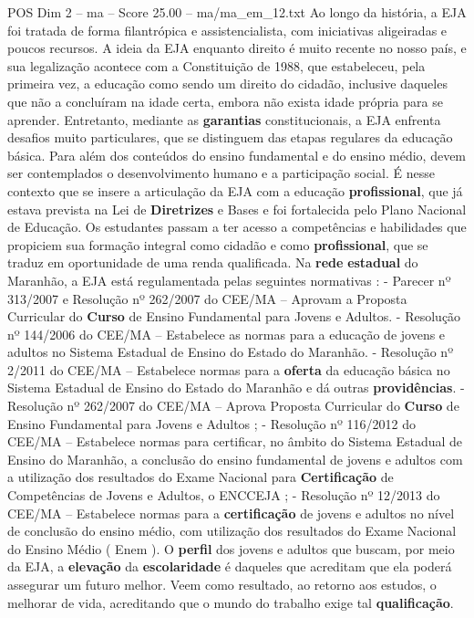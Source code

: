 \begin{textsample}{POS Dim 2 – ma – Score 25.00 – ma/ma\_em\_12.txt}
Ao longo da história, a EJA foi tratada de forma filantrópica e assistencialista, com iniciativas aligeiradas e poucos recursos.
A ideia da EJA enquanto direito é muito recente no nosso país, e sua legalização acontece com a Constituição de 1988, que estabeleceu, pela primeira vez, a educação como sendo um direito do cidadão, inclusive daqueles que não a concluíram na idade certa, embora não exista idade própria para se aprender.
Entretanto, mediante as \textbf{garantias} constitucionais, a EJA enfrenta desafios muito particulares, que se distinguem das etapas regulares da educação básica.
Para além dos conteúdos do ensino fundamental e do ensino médio, devem ser contemplados o desenvolvimento humano e a participação social.
É nesse contexto que se insere a articulação da EJA com a educação \textbf{profissional}, que já estava prevista na Lei de \textbf{Diretrizes} e Bases e foi fortalecida pelo Plano Nacional de Educação.
Os estudantes passam a ter acesso a competências e habilidades que propiciem sua formação integral como cidadão e como \textbf{profissional}, que se traduz em oportunidade de uma renda qualificada.
Na \textbf{rede} \textbf{estadual} do Maranhão, a EJA está regulamentada pelas seguintes normativas : - Parecer nº 313/2007 e Resolução nº 262/2007 do CEE/MA – Aprovam a Proposta Curricular do \textbf{Curso} de Ensino Fundamental para Jovens e Adultos. - Resolução nº 144/2006 do CEE/MA – Estabelece as normas para a educação de jovens e adultos no Sistema Estadual de Ensino do Estado do Maranhão. - Resolução nº 2/2011 do CEE/MA – Estabelece normas para a \textbf{oferta} da educação básica no Sistema Estadual de Ensino do Estado do Maranhão e dá outras \textbf{providências}. - Resolução nº 262/2007 do CEE/MA – Aprova Proposta Curricular do \textbf{Curso} de Ensino Fundamental para Jovens e Adultos ; - Resolução nº 116/2012 do CEE/MA – Estabelece normas para certificar, no âmbito do Sistema Estadual de Ensino do Maranhão, a conclusão do ensino fundamental de jovens e adultos com a utilização dos resultados do Exame Nacional para \textbf{Certificação} de Competências de Jovens e Adultos, o ENCCEJA ; - Resolução nº 12/2013 do CEE/MA – Estabelece normas para a \textbf{certificação} de jovens e adultos no nível de conclusão do ensino médio, com utilização dos resultados do Exame Nacional do Ensino Médio ( Enem ).
O \textbf{perfil} dos jovens e adultos que buscam, por meio da EJA, a \textbf{elevação} da \textbf{escolaridade} é daqueles que acreditam que ela poderá assegurar um futuro melhor.
Veem como resultado, ao retorno aos estudos, o melhorar de vida, acreditando que o mundo do trabalho exige tal \textbf{qualificação}.

\end{textsample}
